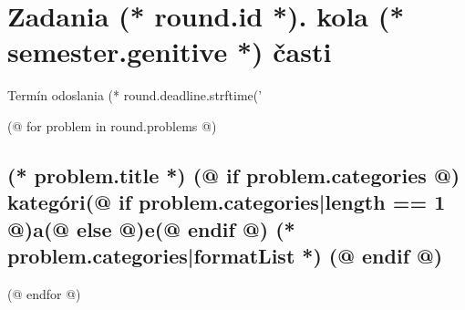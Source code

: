 \documentclass[12pt, twoside]{article}
\newcounter{volume}
\newcounter{semester}
\newcounter{round}
\newcounter{problem}
\begin{document}
    \pagestyle{main}
    \thispagestyle{first}
    \vspace*{2em}

    {
        \section{\texorpdfstring{Zadania (* round.id *). kola (* semester.genitive *) časti}{Zadania}}
        \centering
        \vspace{-1.3em}
        Termín odoslania (* round.deadline.strftime('%
    } 
        
    \pagestyle{problems}    

    (@ for problem in round.problems @)%
    \setcounter{volume}{(* volume.number *)}%
    \setcounter{semester}{(* semester.number *)}%
    \setcounter{round}{(* round.number *)}%
    \setcounter{problem}{(* problem.number *)}%
    
    \subsection{%
        \texorpdfstring{%
            \large \textbf{(* problem.title *)}%
            (@ if problem.categories @)%
            \normalsize \hfill kategóri(@ if problem.categories|length == 1 @)a(@ else @)e(@ endif @) (* problem.categories|formatList *)%
            (@ endif @)
        }{%
            (* problem.title *)%
        }%
    }%
    (@ endfor @)
\end{document}

